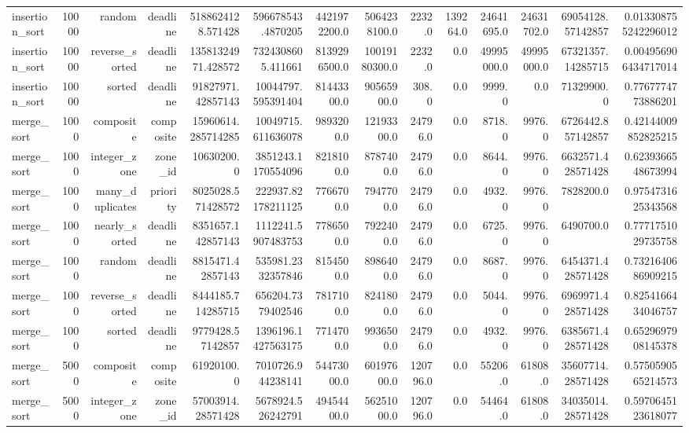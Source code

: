 \begin{table}[htbp]
\begin{tabular}{lrrrrrrrrrrrrr}
insertion_sort & 10000 & random & deadline & 5188624128.571428 & 596678543.4870205 & 4421972200.0 & 5064238100.0 & 2232.0 & 139264.0 & 24641695.0 & 24631702.0 & 69054128.57142857 & 0.013308755242296012 \\
insertion_sort & 10000 & reverse_sorted & deadline & 13581324971.428572 & 7324308605.411661 & 8139296500.0 & 10019180300.0 & 2232.0 & 0.0 & 49995000.0 & 49995000.0 & 67321357.14285715 & 0.004956906434717014 \\
insertion_sort & 10000 & sorted & deadline & 91827971.42857143 & 10044797.595391404 & 81443300.0 & 90565900.0 & 308.0 & 0.0 & 9999.0 & 0.0 & 71329900.0 & 0.7767774773886201 \\
merge_sort & 1000 & composite & composite & 15960614.285714285 & 10049715.611636078 & 9893200.0 & 12193300.0 & 24796.0 & 0.0 & 8718.0 & 9976.0 & 6726442.857142857 & 0.42144009852825215 \\
merge_sort & 1000 & integer_zone & zone_id & 10630200.0 & 3851243.1170554096 & 8218100.0 & 8787400.0 & 24796.0 & 0.0 & 8644.0 & 9976.0 & 6632571.428571428 & 0.6239366548673994 \\
merge_sort & 1000 & many_duplicates & priority & 8025028.571428572 & 222937.82178211125 & 7766700.0 & 7947700.0 & 24796.0 & 0.0 & 4932.0 & 9976.0 & 7828200.0 & 0.9754731625343568 \\
merge_sort & 1000 & nearly_sorted & deadline & 8351657.142857143 & 1112241.5907483753 & 7786500.0 & 7922400.0 & 24796.0 & 0.0 & 6725.0 & 9976.0 & 6490700.0 & 0.7771751029735758 \\
merge_sort & 1000 & random & deadline & 8815471.42857143 & 535981.2332357846 & 8154500.0 & 8986400.0 & 24796.0 & 0.0 & 8687.0 & 9976.0 & 6454371.428571428 & 0.7321640686909215 \\
merge_sort & 1000 & reverse_sorted & deadline & 8444185.714285715 & 656204.7379402546 & 7817100.0 & 8241800.0 & 24796.0 & 0.0 & 5044.0 & 9976.0 & 6969971.428571428 & 0.8254166434046757 \\
merge_sort & 1000 & sorted & deadline & 9779428.57142857 & 1396196.1427563175 & 7714700.0 & 9936500.0 & 24796.0 & 0.0 & 4932.0 & 9976.0 & 6385671.428571428 & 0.6529697908145378 \\
merge_sort & 5000 & composite & composite & 61920100.0 & 7010726.944238141 & 54473000.0 & 60197600.0 & 120796.0 & 0.0 & 55206.0 & 61808.0 & 35607714.28571428 & 0.5750590565214573 \\
merge_sort & 5000 & integer_zone & zone_id & 57003914.28571428 & 5678924.526242791 & 49454400.0 & 56251000.0 & 120796.0 & 0.0 & 54464.0 & 61808.0 & 34035014.28571428 & 0.5970645123618077 \\

\end{tabular}
\end{table}
